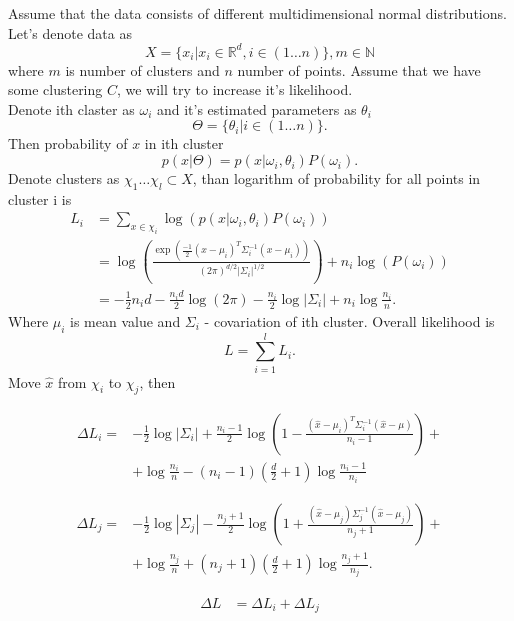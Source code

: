 \documentclass[a4paper, 12pt]{article}
\theoremstyle{definition}
\theoremstyle{definition}
\theoremstyle{remark}
\begin{document}
Assume that the data consists of different multidimensional normal distributions. \\
Let's denote data as  
$$X = \{x_i | x_i \in \mathbb{R}^d, i \in \left( 1 \ldots n \right) \}, m \in \mathbb{N}$$
where $m$ is number of clusters and $n$ number of points. 
Assume that we have some clustering $C$, we will try to increase it's likelihood. \\
Denote ith claster as $\omega_i$ and it's estimated parameters as $\theta_i$
$$ \Theta = \{ \theta_i | i \in (1 \ldots n)\}.$$
Then probability of $x$ in ith cluster
$$ p(x | \Theta) = p(x | \omega_i, \theta_i) P(\omega_i).$$
Denote clusters as $ \chi_1 \ldots \chi_l \subset X $, 
than logarithm of probability for all points in cluster i is 
\begin{align*}
    L_i &= \sum_{x \in \chi_i} \log(p(x| \omega_i, \theta_i)P(\omega_i)) \\
        &=  \log \left( 
        \frac{ \exp \left( \frac{-1}{2} (x - \mu_i)^T \Sigma_i^{-1} (x - \mu_i) \right) }
        {(2 \pi)^{d/2} |\Sigma_i| ^ {1/2}}
        \right) + n_i \log(P(\omega_i)) \\
        &= -\frac{1}{2} n_i d - \frac{n_i d}{2} \log(2 \pi) - \frac{n_i}{2} \log |\Sigma_i| + n_i \log \frac{n_i}{n}.
\end{align*} 
Where $\mu_i$ is mean value and $\Sigma_i$ - covariation of ith cluster.
Overall likelihood is 
$$ L = \sum_{i = 1}^l L_i.$$
Move $\hat{x}$ from $\chi_i$ to $\chi_j$, then

\begin{align*}
    \Delta L_i = &-\frac{1}{2} \log |\Sigma_i| + \frac{n_i - 1}{2} 
        \log \left(1 - \frac{(\hat{x} - \mu_i)^T \Sigma_i^{-1}(\hat{x} - \mu)}{n_i - 1} \right) + \\
         &+ \log \frac{n_i}{n} - (n_i - 1)(\frac{d}{2} + 1) \log \frac{n_i - 1}{n_i}
\end{align*}

\begin{align*}
    \Delta L_j = &-\frac{1}{2} \log |\Sigma_j| - \frac{n_j + 1}{2} 
        \log \left(1 + \frac{(\hat{x} - \mu_j) \Sigma_j^{-1} (\hat{x} - \mu_j)}{n_j + 1}\right) + \\
         &+ \log \frac{n_j}{n} + (n_j + 1)(\frac{d}{2} + 1) \log \frac{n_j + 1}{n_j}.
\end{align*}

\begin{align*}
    \Delta L &= \Delta L_i + \Delta L_j
\end{align*}
\end{document}
